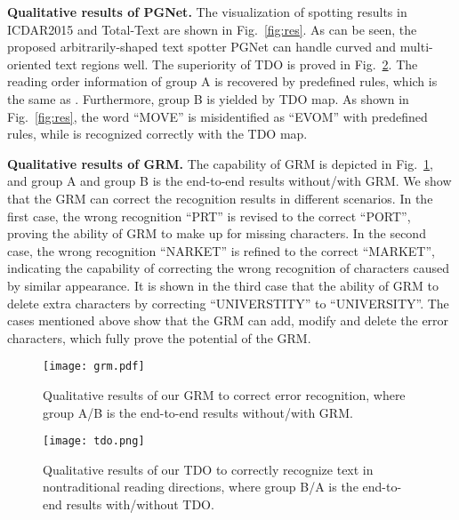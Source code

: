 \documentclass[letterpaper]{article} \usepackage{aaai21}  \usepackage{times}  \usepackage{helvet} \usepackage{courier}  \usepackage[hyphens]{url}  \usepackage{graphicx} \urlstyle{rm} \def\UrlFont{\rm}  \usepackage{natbib}  \usepackage{caption} \usepackage{bm}
\begin{document}
\textbf{Qualitative results of PGNet.} The visualization of spotting results in ICDAR2015 and Total-Text are shown in Fig.~\ref{fig:res}. As can be seen, the proposed arbitrarily-shaped text spotter PGNet can handle curved and multi-oriented text regions well. The superiority of TDO is proved in Fig.~\ref{fig:tdo}. The reading order information of group A is recovered by predefined rules, which is the same as \cite{feng2019textdragon}. Furthermore, group B is yielded by TDO map. As shown in Fig.~\ref{fig:res}, the word ``MOVE'' is misidentified as ``EVOM'' with predefined rules, while is recognized correctly with the TDO map. 

\textbf{Qualitative results of GRM.} The capability of GRM is depicted in Fig.~\ref{fig:grm}, and group A and group B is the end-to-end results without/with GRM. We show that the GRM can correct the recognition results in different scenarios. In the first case, the wrong recognition ``PRT'' is revised to the correct ``PORT'', proving the ability of GRM to make up for missing characters. In the second case, the wrong recognition ``NARKET'' is refined to the correct ``MARKET'', indicating the capability of correcting the wrong recognition of characters caused by similar appearance. It is shown in the third case that the ability of GRM to delete extra characters by correcting ``UNIVERSTITY'' to ``UNIVERSITY''. The cases mentioned above show that the GRM can add, modify and delete the error characters, which fully prove the potential of the GRM.

\begin{figure}
    \centering
    \texttt{[image: grm.pdf]}
    \caption{Qualitative results of our GRM to correct error recognition, where group A/B is the end-to-end results without/with GRM.}
    \label{fig:grm}
\end{figure}


\begin{figure}
    \centering
    \texttt{[image: tdo.png]}
    \caption{Qualitative results of our TDO to correctly recognize text in nontraditional reading directions, where group B/A is the end-to-end results with/without TDO.}
    \label{fig:tdo}
\end{figure}



\end{document}
